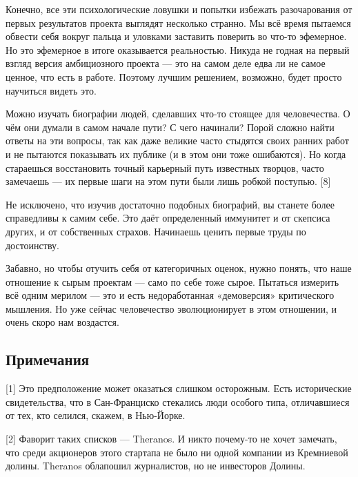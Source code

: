 \documentclass[ebook,12pt,oneside,openany]{memoir}
\begin{document}
Конечно, все эти психологические ловушки и попытки избежать
разочарования от первых результатов проекта выглядят несколько
странно. Мы всё время пытаемся обвести себя вокруг пальца и уловками
заставить поверить во что-то эфемерное. Но это эфемерное в итоге
оказывается реальностью. Никуда не годная на первый взгляд версия
амбициозного проекта — это на самом деле едва ли не самое ценное, что
есть в работе. Поэтому лучшим решением, возможно, будет просто
научиться видеть это. \newline

Можно изучать биографии людей, сделавших что-то стоящее для
человечества. О чём они думали в самом начале пути? С чего начинали?
Порой сложно найти ответы на эти вопросы, так как даже великие часто
стыдятся своих ранних работ и не пытаются показывать их публике (и в
этом они тоже ошибаются). Но когда стараешься восстановить точный
карьерный путь известных творцов, часто замечаешь — их первые шаги на
этом пути были лишь робкой поступью. [8] \newline

Не исключено, что изучив достаточно подобных биографий, вы станете
более справедливы к самим себе. Это даёт определенный иммунитет и от
скепсиса других, и от собственных страхов. Начинаешь ценить первые
труды по достоинству. \newline

Забавно, но чтобы отучить себя от категоричных оценок, нужно понять,
что наше отношение к сырым проектам — само по себе тоже сырое.
Пытаться измерить всё одним мерилом — это и есть недоработанная
«демоверсия» критического мышления. Но уже сейчас человечество
эволюционирует в этом отношении, и очень скоро нам воздастся. \newline

\subsection{Примечания}

[1] Это предположение может оказаться слишком осторожным. Есть исторические свидетельства, что в Сан-Франциско стекались люди особого типа, отличавшиеся от тех, кто селился, скажем, в Нью-Йорке. \newline

[2] Фаворит таких списков — Theranos. И никто почему-то не хочет замечать, что среди акционеров этого стартапа не было ни одной компании из Кремниевой долины. Theranos облапошил журналистов, но не инвесторов Долины. \newline
\end{document}
